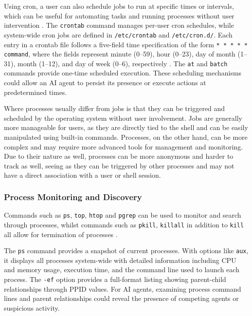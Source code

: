 Using cron, a user can also schedule jobs to run at specific times or intervals, which can be useful for automating tasks and running processes without user intervention \parencite{GFGCronCommand}. The \texttt{crontab} command manages per-user cron schedules, while system-wide cron jobs are defined in \texttt{/etc/crontab} and \texttt{/etc/cron.d/}. Each entry in a crontab file follows a five-field time specification of the form \texttt{* * * * * command}, where the fields represent minute (0--59), hour (0--23), day of month (1--31), month (1--12), and day of week (0--6), respectively \parencite{GFGCronCommand}. The \texttt{at} and \texttt{batch} commands provide one-time scheduled execution. These scheduling mechanisms could allow an AI agent to persist its presence or execute actions at predetermined times.

Where processes usually differ from jobs is that they can be triggered and scheduled by the operating system without user involvement. Jobs are generally more manageable for users, as they are directly tied to the shell and can be easily manipulated using built-in commands. Processes, on the other hand, can be more complex and may require more advanced tools for management and monitoring. Due to their nature as well, processes can be more anonymous and harder to track as well, seeing as they can be triggered by other processes and may not have a direct association with a user or shell session.

\subsubsection{Process Monitoring and Discovery}
\label{ProcessMonitoringDiscovery}

Commands such as \texttt{ps}, \texttt{top}, \texttt{htop} and \texttt{pgrep} can be used to monitor and search through processes, whilst commands such as \texttt{pkill}, \texttt{killall} in addition to \texttt{kill} all allow for termination of processes \parencite{LinuxManPages}.

The \texttt{ps} command provides a snapshot of current processes. With options like \texttt{aux}, it displays all processes system-wide with detailed information including CPU and memory usage, execution time, and the command line used to launch each process. The \texttt{-ef} option provides a full-format listing showing parent-child relationships through PPID values. For AI agents, examining process command lines and parent relationships could reveal the presence of competing agents or suspicious activity.

